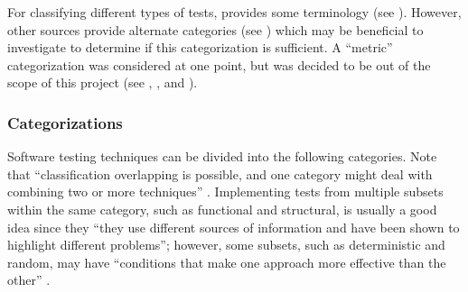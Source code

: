 For classifying different types of tests, \citet{IEEE2022} provides some
terminology (see ). However, other sources \citep{BarbosaEtAl2006,
      SouzaEtAl2017} provide alternate
categories (see ) which may be beneficial to investigate to
determine if this categorization is sufficient. A ``metric'' categorization was
considered at one point, but was decided to be out of the scope of this project
(see , , and ).

\begin{landscape}
      \ieeeTestTermsTable{}
\end{landscape}

\begin{landscape}
      \otherTestTermsTable{}
\end{landscape}
\restoregeometry

\subsubsection{Categorizations}
\label{testing-categories}

Software testing techniques can be divided into the following
categories. Note that ``classification overlapping is possible, and one
category might deal with combining two or more techniques''
\citep[p.~5-10]{SWEBOK2024}. Implementing tests from multiple subsets within
the same category, such as functional and structural, is usually a good idea
since they ``they use different sources of information and have been shown to
highlight different problems''; however, some subsets, such as deterministic
and random, may have ``conditions that make one approach more effective than
the other'' \citep[p.~5-16]{SWEBOK2024}.

